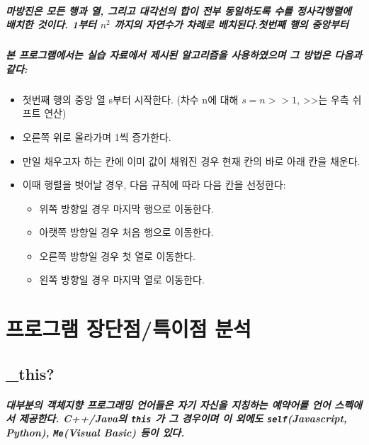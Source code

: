 \documentclass[UTF8]{report}
\begin{document}
            \paragraph{%
                \normalfont 마방진은 모든 행과 열, 그리고 대각선의 합이 전부 동일하도록 수를 정사각행렬에 배치한 것이다. 1부터 $n^2$ 까지의 자연수가 차례로 배치된다.첫번째 행의 중앙부터 
            }

            \paragraph{%
                \normalfont 본 프로그램에서는 실습 자료에서 제시된 알고리즘을 사용하였으며 그 방법은 다음과 같다:
            }

            \begin{itemize}
                \item 첫번째 행의 중앙 열 s부터 시작한다. (차수 n에 대해 $s = n >> 1$, >>는 우측 쉬프트 연산)
                \item 오른쪽 위로 올라가며 1씩 증가한다.
                \item 만일 채우고자 하는 칸에 이미 값이 채워진 경우 현재 칸의 바로 아래 칸을 채운다.
                \item 이때 행렬을 벗어날 경우, 다음 규칙에 따라 다음 칸을 선정한다:\\
                      \begin{itemize}
                          \item 위쪽 방향일 경우 마지막 행으로 이동한다.
                          \item 아랫쪽 방향일 경우 처음 행으로 이동한다.
                          \item 오른쪽 방향일 경우 첫 열로 이동한다.
                          \item 왼쪽 방향일 경우 마지막 열로 이동한다.
                      \end{itemize}
            \end{itemize}
            
    \chapter{프로그램 장단점/특이점 분석}
        \section{\_this?}
            \paragraph{%
                \normalfont 대부분의 객체지향 프로그래밍 언어들은 자기 자신을 지칭하는 예약어를 언어 스펙에서 제공한다. C++/Java의 \texttt{this} 가 그 경우이며 이 외에도 \texttt{self}(Javascript, Python), \texttt{Me}(Visual Basic) 등이 있다.
            }
\end{document}
